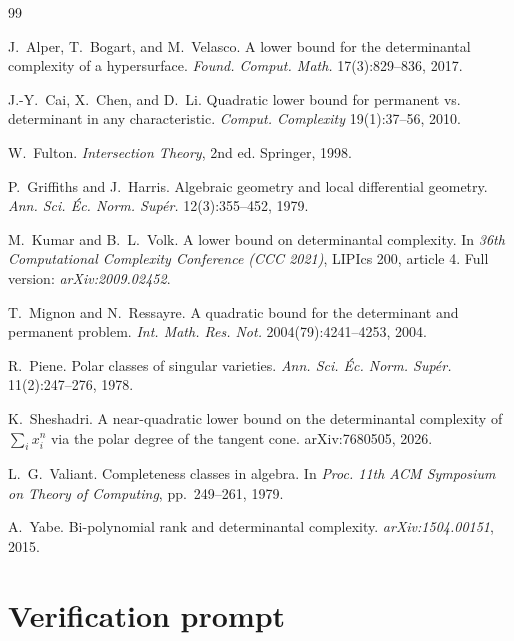 \documentclass[11pt]{article}
\theoremstyle{plain}
\theoremstyle{definition}
\begin{document}
\begin{thebibliography}{99}

J.~Alper, T.~Bogart, and M.~Velasco.
\newblock A lower bound for the determinantal complexity of a hypersurface.
\newblock \emph{Found. Comput. Math.} 17(3):829--836, 2017.

J.-Y.~Cai, X.~Chen, and D.~Li.
\newblock Quadratic lower bound for permanent vs. determinant in any
characteristic.
\newblock \emph{Comput. Complexity} 19(1):37--56, 2010.

W.~Fulton.
\newblock \emph{Intersection Theory}, 2nd ed.
\newblock Springer, 1998.

P.~Griffiths and J.~Harris.
\newblock Algebraic geometry and local differential geometry.
\newblock \emph{Ann. Sci. \'Ec. Norm. Sup\'er.} 12(3):355--452, 1979.

M.~Kumar and B.~L.~Volk.
\newblock A lower bound on determinantal complexity.
\newblock In \emph{36th Computational Complexity Conference (CCC 2021)},
LIPIcs 200, article 4.  Full version: \emph{arXiv:2009.02452}.

T.~Mignon and N.~Ressayre.
\newblock A quadratic bound for the determinant and permanent problem.
\newblock \emph{Int. Math. Res. Not.} 2004(79):4241--4253, 2004.

R.~Piene.
\newblock Polar classes of singular varieties.
\newblock \emph{Ann. Sci. \'Ec. Norm. Sup\'er.} 11(2):247--276, 1978.

K.~Sheshadri.
\newblock A near-quadratic lower bound on the determinantal complexity of
$\sum_i x_i^n$ via the polar degree of the tangent cone.
\newblock arXiv:7680505, 2026.

L.~G.~Valiant.
\newblock Completeness classes in algebra.
\newblock In \emph{Proc. 11th ACM Symposium on Theory of Computing},
pp.~249--261, 1979.

A.~Yabe.
\newblock Bi-polynomial rank and determinantal complexity.
\newblock \emph{arXiv:1504.00151}, 2015.

\end{thebibliography}

\appendix

\section{Verification prompt}
\label{app:prompt}
\end{document}
